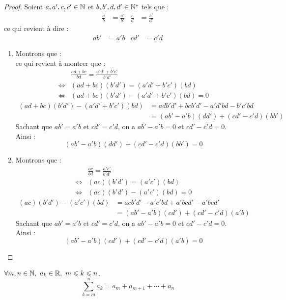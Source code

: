\begin{proof}
	Soient $a, a', c, c' \in \mathbb{N}$ et $b, b', d, d' \in \mathbb{N}^*$ tels que :
	\begin{align*}
		\frac{a}{b} &= \frac{a'}{b'} & \frac{c}{d} &= \frac{c'}{d'}
	\end{align*}
	ce qui revient à dire :
	\begin{align*}
		ab' &= a'b & cd' &= c'd
	\end{align*}
	\begin{enumerate}
		\item Montrons que :
		\[  \]
		ce qui revient à montrer que :
		\begin{align*}
			&\frac{ad + bc}{bd} = \frac{a'd' + b'c'}{b'd'} \\
			\iff &(ad + bc)(b'd') = (a'd' + b'c')(bd)
			\\
			\iff &(ad + bc)(b'd') - (a'd' + b'c')(bd) = 0
		\end{align*}
		\begin{align*}
			(ad + bc)(b'd') - (a'd' + b'c')(bd) &= adb'd' + bcb'd' - a'd'bd - b'c'bd \\
			&= (ab' - a'b)(dd') + (cd' - c'd)(bb')
		\end{align*}
		Sachant que $ab' = a'b$ et $cd' = c'd$, on a $ab' - a'b = 0$ et $cd' - c'd = 0$.
		\\
		Ainsi :
		\[ (ab' - a'b)(dd') + (cd' - c'd)(bb') = 0 \]
		\item Montrons que :
		\begin{align*}
			&\frac{ac}{bd} = \frac{a'c'}{b'd'} \\
			\iff &(ac)(b'd') = (a'c')(bd) \\
			\iff &(ac)(b'd') - (a'c')(bd) = 0
		\end{align*}
		\begin{align*}
			(ac)(b'd') - (a'c')(bd) &= acb'd' - a'c'bd + a'bcd' - a'bcd' \\
			&= (ab' - a'b)(cd') + (cd' - c'd)(a'b) 
		\end{align*}
		Sachant que $ab' = a'b$ et $cd' = c'd$, on a $ab' - a'b = 0$ et $cd' - c'd = 0$.
		\\
		Ainsi :
		\[ (ab' - a'b)(cd') + (cd' - c'd)(a'b) = 0 \]
	\end{enumerate}
\end{proof}

\begin{definition}[Somme]
    $\forall m, n \in \mathbb{N},\ a_k \in \mathbb{R},\ m \leqslant k \leqslant n$.
    \[ \sum_{k = m}^n a_k = a_m + a_{m + 1} + \cdots + a_n \]
\end{definition}

